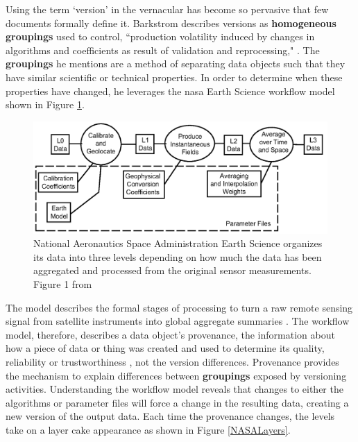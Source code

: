 Using the term `version' in the vernacular has become so pervasive that few documents formally define it.
Barkstrom describes versions as \textbf{homogeneous groupings} used to control, ``production volatility induced by changes in algorithms and coefficients as result of validation and reprocessing," \cite{Barkstrom2003}.
The \textbf{groupings} he mentions are a method of separating data objects such that they have similar scientific or technical properties.
In order to determine when these properties have changed, he leverages the \gls{nasa} Earth Science workflow model shown in Figure \ref{NASALevels}.
\begin{figure}
	\centering
	\includegraphics[scale=0.35]{figures/NASALevels.png}
	\caption[National Aeronautics and Space Administration Earth Science organizes its data into three levels depending on how much the data has been aggregated and processed from the original sensor measurements.]{National Aeronautics Space Administration Earth Science organizes its data into three levels depending on how much the data has been aggregated and processed from the original sensor measurements. Figure 1 from \cite{Barkstrom2003}}
	\label{NASALevels}
\end{figure}
The model describes the formal stages of processing to turn a raw remote sensing signal from satellite instruments into global aggregate summaries \cite{Barkstrom2003}.
The workflow model, therefore, describes a data object's \gls{provenance}, the information about how a piece of data or thing was created and used to determine its quality, reliability or trustworthiness \cite{Moreau2013c}, not the version differences.
Provenance provides the mechanism to explain differences between \textbf{groupings} exposed by versioning activities.
Understanding the workflow model reveals that changes to either the algorithms or parameter files will force a change in the resulting data, creating a new version of the output data.
Each time the provenance changes, the levels take on a layer cake appearance as shown in Figure \ref{NASALayers}. 
